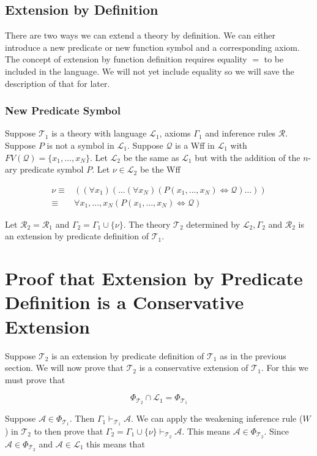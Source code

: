 \documentclass[12pt]{article}
\newcommand{\mc}[1]{\mathcal{#1}}
\begin{document}
\subsection*{Extension by Definition}
There are two ways we can extend a theory by definition. 
We can either introduce a new predicate or new function symbol and a corresponding axiom.
The concept of extension by function definition requires equality $=$ to be included in the language.
We will not yet include equality so we will save the description of that for later.

\subsubsection*{New Predicate Symbol}

Suppose $\mc{T}_1$ is a theory with language $\mc{L}_1$, axioms $\Gamma_1$ and inference rules $\mc{R}$.
Suppose $P$ is not a symbol in $\mc{L}_1$.
Suppose $\mc{Q}$ is a Wff in $\mc{L}_1$ with $FV(\mc{Q}) = \{x_1, \ldots , x_N\}$.
Let $\mc{L}_2$ be the same as $\mc{L}_1$ but with the addition of the $n$-ary predicate symbol $P$.
Let $\nu\in \mc{L}_2$ be the Wff

\begin{align*}
\nu \equiv& ((\forall x_1) (\ldots (\forall x_N) (P(x_1, \ldots, x_N) \iff \mc{Q}) \ldots ))\\
\equiv& \forall x_1,\ldots,x_N (P(x_1, \ldots, x_N) \iff \mc{Q})
\end{align*}

Let $\mc{R}_2 = \mc{R}_1$ and $\Gamma_2 = \Gamma_1 \cup \{\nu\}$.
The theory $\mc{T}_2$ determined by $\mc{L}_2, \Gamma_2$ and $\mc{R}_2$ is an extension by predicate definition of $\mc{T}_1$.

\section{Proof that Extension by Predicate Definition is a Conservative Extension}

Suppose $\mc{T}_2$ is an extension by predicate definition of $\mc{T}_1$ as in the previous section.
We will now prove that $\mc{T}_2$ is a conservative extension of $\mc{T}_1$.
For this we must prove that

$$
\Phi_{\mc{T}_2} \cap \mc{L}_1 = \Phi_{\mc{T}_1}
$$

Suppose $\mc{A} \in \Phi_{\mc{T}_1}$.
Then $\Gamma_1 \vdash_{\mc{T}_1} \mc{A}$.
We can apply the weakening inference rule ($W$) in $\mc{T}_2$ to then prove that $\Gamma_2 = \Gamma_1 \cup \{\nu\} \vdash_{\mc{T}_2} \mc{A}$.
This means $\mc{A} \in \Phi_{\mc{T}_2}$.
Since $\mc{A} \in \Phi_{\mc{T}_2}$ and $\mc{A} \in \mc{L}_1$ this means that
\end{document}
